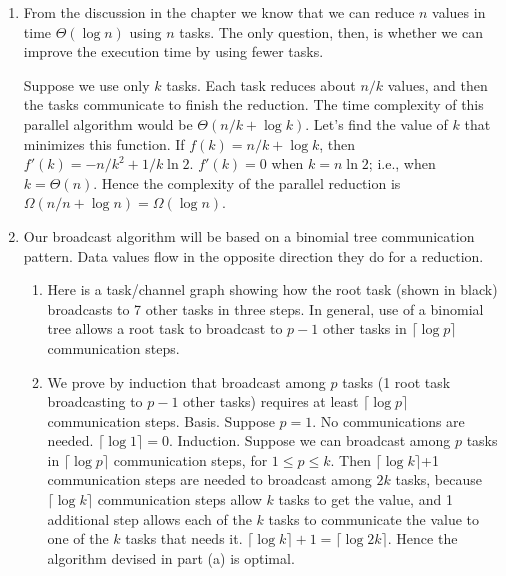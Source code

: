 \begin{enumerate}
\item From the discussion in the chapter we know that we can reduce $n$ values
      in time $\Theta(\log n)$ using $n$ tasks. The only
      question, then, is whether we can improve the execution time by
      using fewer tasks.

      Suppose we use only $k$ tasks. Each task reduces about $n/k$ values,
      and then the tasks communicate to finish the reduction. The time
      complexity of this parallel algorithm would be
      $\Theta(n/k + \log k)$.
      Let's find the value of $k$ that minimizes this function.
      If $f(k) = n/k + \log k$, then
      $f'(k) = -n/k^2 + 1/k\ln{2}$.
      $f'(k) = 0$ when $k = n\ln 2$; i.e., when $k = \Theta(n)$.
      Hence the complexity of the parallel reduction is
      $\Omega(n/n + \log n) = \Omega(\log n)$.

\item Our broadcast algorithm will be based on a binomial tree communication
      pattern. Data values flow in the opposite direction they do for a
      reduction.
      \begin{enumerate}
      \item Here is a task/channel graph showing how the root task (shown in
            black) broadcasts
            to 7 other tasks in three steps. In general, use of a binomial
            tree allows a root task to broadcast to $p-1$ other tasks in
            $\lceil\log p\rceil$ communication steps.
      \begin{center}
      \end{center}

      \item We prove by induction that broadcast among $p$ tasks (1 root task
            broadcasting to $p-1$ other tasks) requires at least
            $\lceil \log p\rceil$ communication steps.
            Basis. Suppose $p = 1$. No communications are needed.
            $\lceil \log 1\rceil = 0$.
            Induction. Suppose we can broadcast among $p$ tasks in
            $\lceil \log p\rceil$ communication steps, for $1 \le p \le k$.
            Then $\lceil \log k\rceil$+1 communication steps are needed to
            broadcast among $2k$ tasks, because 
            $\lceil \log k\rceil$ communication steps allow $k$ tasks to
            get the value, and 1 additional step allows each of the $k$ tasks to
            communicate the value to one of the $k$ tasks that needs it.
            $\lceil\log k\rceil + 1 = \lceil \log 2k\rceil$.
            Hence the algorithm devised in part (a) is optimal. 
      \end{enumerate}


\end{enumerate}
